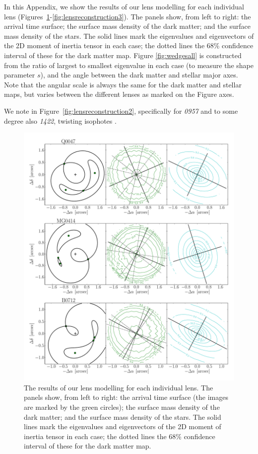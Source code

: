\documentclass[useAMS,usenatbib]{mn2e}
\begin{document}
In this Appendix, we show the results of our lens modelling for each individual lens (Figures~\ref{fig:lensreconstruction1}-\ref{fig:lensreconstruction3}). The panels show, from left to right: the arrival time surface; the surface mass density of the dark matter; and the surface mass density of the stars. The solid lines mark the eigenvalues and eigenvectors of the 2D moment of inertia tensor in each case; the dotted lines the 68\% confidence interval of these for the dark matter map. Figure \ref{fig:wedgesall} is constructed from the ratio of largest to smallest eigenvalue in each case (to measure the shape parameter $s$), and the angle between the dark matter and stellar major axes. Note that the angular scale is always the same for the dark matter and stellar maps, but varies between the different lenses as marked on the Figure axes.

We note in Figure~\ref{fig:lensreconstruction2}, specifically for {\it0957} and to some degree also {\it1422}, twisting isophotes \citep[e.g.][]{1978ComAp...8...27B}.

\begin{figure}
  \centering
  \includegraphics[width=.8\linewidth]{Figures/AllLenses31.pdf}
  \caption[width=.65\linewidth]{The results of our lens modelling for each individual lens. The panels show, from left to right: the arrival time surface (the images are marked by the green circles); the surface mass density of the dark matter; and the surface mass density of the stars. The solid lines mark the eigenvalues and eigenvectors of the 2D moment of inertia tensor in each case; the dotted lines the 68\% confidence interval of these for the dark matter map.}
  \label{fig:lensreconstruction1}
\end{figure}
\end{document}
